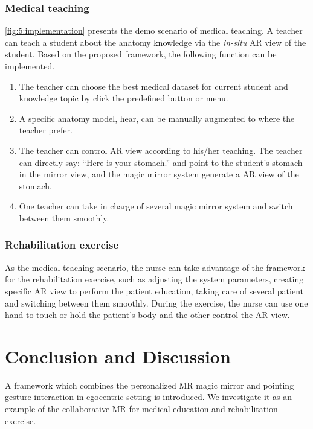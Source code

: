 \subsubsection{Medical teaching}
\figurename{\ref{fig:5:implementation}} presents the demo scenario of medical teaching. A teacher can teach a student about the anatomy knowledge via the \textit{in-situ} AR view of the student. Based on the proposed framework, the following function can be implemented. 
\begin{enumerate}
	\item The teacher can choose the best medical dataset for current student and knowledge topic by click the predefined button or menu. 
	\item A specific anatomy model, \eg hear, can be manually augmented to where the teacher prefer. 
	\item The teacher can control AR view according to his/her teaching. The teacher can directly say: ``Here is your stomach.'' and point to the student's stomach in the mirror view, and the magic mirror system generate a AR view of the stomach. 
	\item One teacher can take in charge of several magic mirror system and switch between them smoothly.
\end{enumerate}

\subsubsection{Rehabilitation exercise}
As the medical teaching scenario, the nurse can take advantage of the framework for the rehabilitation exercise, such as adjusting the system parameters, creating specific AR view to perform the patient education, taking care of several patient and switching between them smoothly.
During the exercise, the nurse can use one hand to touch or hold the patient's body and the other control the AR view.

\section{Conclusion and Discussion}
A framework which combines the personalized MR magic mirror and pointing gesture interaction in egocentric setting is introduced. We investigate it as an example of the collaborative MR for medical education and rehabilitation exercise. 